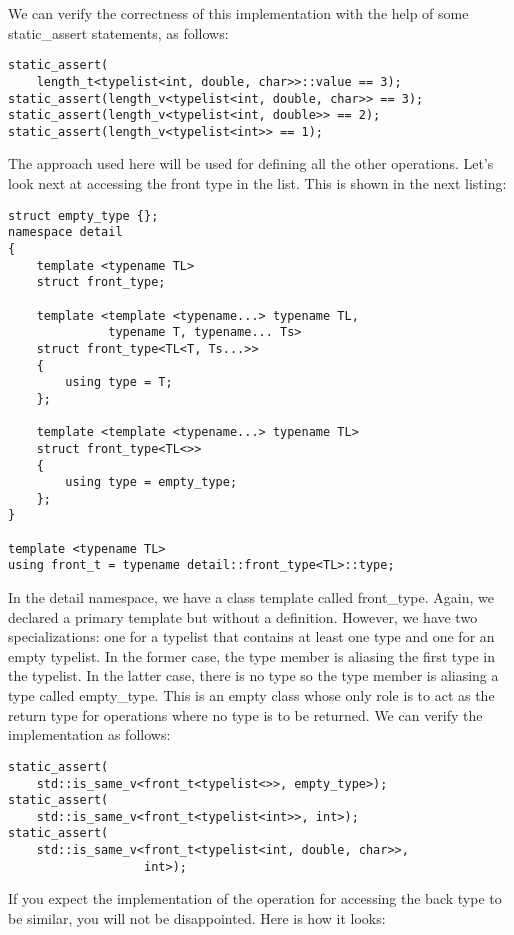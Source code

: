 We can verify the correctness of this implementation with the help of some static\_assert statements, as follows:

\begin{lstlisting}[style=styleCXX]
static_assert(
	length_t<typelist<int, double, char>>::value == 3);
static_assert(length_v<typelist<int, double, char>> == 3);
static_assert(length_v<typelist<int, double>> == 2);
static_assert(length_v<typelist<int>> == 1);
\end{lstlisting}

The approach used here will be used for defining all the other operations. Let’s look next at accessing the front type in the list. This is shown in the next listing:

\begin{lstlisting}[style=styleCXX]
struct empty_type {};
namespace detail
{
	template <typename TL>
	struct front_type;
	
	template <template <typename...> typename TL,
			  typename T, typename... Ts>
	struct front_type<TL<T, Ts...>>
	{
		using type = T;
	};

	template <template <typename...> typename TL>
	struct front_type<TL<>>
	{
		using type = empty_type;
	};
}

template <typename TL>
using front_t = typename detail::front_type<TL>::type;
\end{lstlisting}

In the detail namespace, we have a class template called front\_type. Again, we declared a primary template but without a definition. However, we have two specializations: one for a typelist that contains at least one type and one for an empty typelist. In the former case, the type member is aliasing the first type in the typelist. In the latter case, there is no type so the type member is aliasing a type called empty\_type. This is an empty class whose only role is to act as the return type for operations where no type is to be returned. We can verify the implementation as follows:

\begin{lstlisting}[style=styleCXX]
static_assert(
	std::is_same_v<front_t<typelist<>>, empty_type>);
static_assert(
	std::is_same_v<front_t<typelist<int>>, int>);
static_assert(
	std::is_same_v<front_t<typelist<int, double, char>>,
				   int>);
\end{lstlisting}

If you expect the implementation of the operation for accessing the back type to be similar, you will not be disappointed. Here is how it looks:

